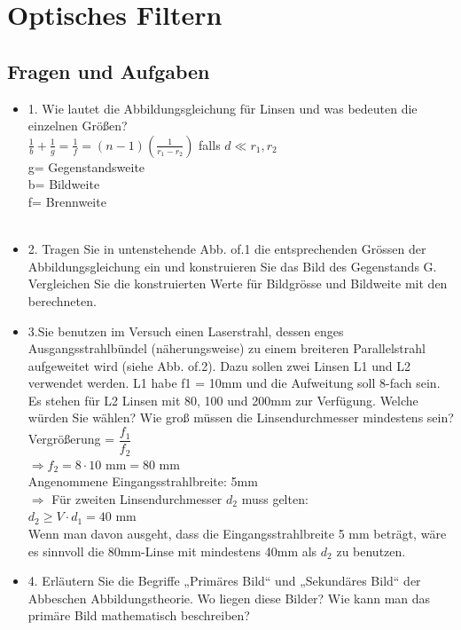 \chapter{Optisches Filtern}
\section{Fragen und Aufgaben}
\begin{itemize}
	\item 1. Wie lautet die Abbildungsgleichung für Linsen und was bedeuten die einzelnen Größen?\\
	$\frac{1}{b}+\frac{1}{g}=\frac{1}{f}=(n-1)\left(\frac{1}{r_1-r_2}\right)$ falls $d \ll r_1, r_2$\\
	g= Gegenstandsweite \\
	b= Bildweite\\
	f= Brennweite\\ \\
	\item 2. Tragen Sie in untenstehende Abb. of.1 die entsprechenden Grössen der Abbildungsgleichung
	ein und konstruieren Sie das Bild des Gegenstands G. Vergleichen Sie die konstruierten Werte
	für Bildgrösse und Bildweite mit den berechneten.
	\item 3.Sie benutzen im Versuch einen Laserstrahl, dessen enges Ausgangsstrahlbündel (näherungsweise)
	zu einem breiteren Parallelstrahl aufgeweitet wird (siehe Abb. of.2). Dazu sollen zwei
	Linsen L1 und L2 verwendet werden. L1 habe f1 = 10mm und die Aufweitung soll 8-fach sein.
	Es stehen für L2 Linsen mit 80, 100 und 200mm zur Verfügung. Welche würden Sie wählen?
	Wie groß müssen die Linsendurchmesser mindestens sein?\\
	Vergrößerung = $\dfrac{f_1}{f_2}$\\
	$\Rightarrow f_2=8 \cdot 10 \text{ mm}=80 \text{ mm}$\\
	Angenommene Eingangsstrahlbreite: 5mm\\ $\Rightarrow$ Für zweiten Linsendurchmesser $d_2$ muss gelten: \\
	$d_2 \geq V \cdot d_1= 40 \text{ mm}$
\\Wenn man davon ausgeht, dass die Eingangsstrahlbreite 5 mm beträgt, wäre es sinnvoll die 80mm-Linse mit mindestens 40mm als $d_2$ zu benutzen. 
	\item 4. Erläutern Sie die Begriffe „Primäres Bild“ und „Sekundäres Bild“ der Abbeschen Abbildungstheorie.
	Wo liegen diese Bilder? Wie kann man das primäre Bild mathematisch beschreiben?\\

\end{itemize}
